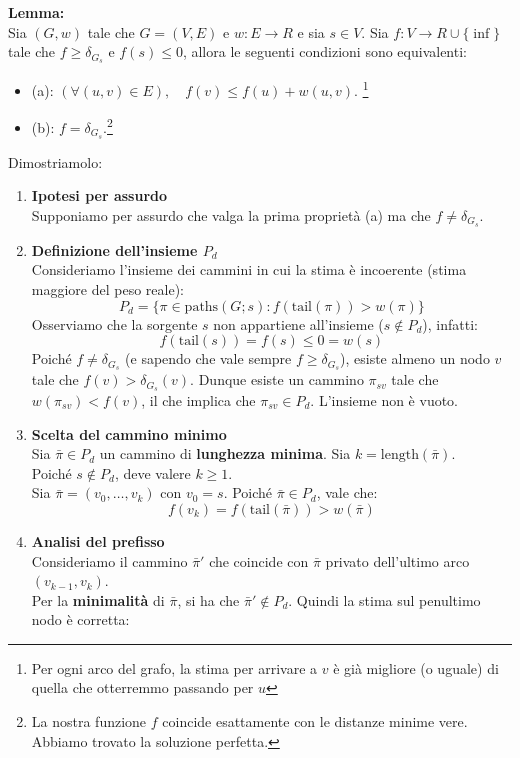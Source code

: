 \textbf{Lemma:}\\
Sia $(G,w)$ tale che $G=(V,E)$ e $w:E\rightarrow R$ e sia $s \in V$. Sia $f:V\rightarrow R \cup \{\inf\}$ tale che $f \geq \delta_{G_s}$ e $f(s)\leq 0$, allora le seguenti condizioni sono equivalenti:
\begin{itemize}
    \item (a): $(\forall(u,v) \in E), \quad f(v) \leq f(u)+ w(u,v)$. \footnote{Per ogni arco del grafo, la stima per arrivare a $v$ è già migliore (o uguale) di quella che otterremmo passando per $u$}
    \item (b): $f=\delta_{G_s}$.\footnote{La nostra funzione $f$ coincide esattamente con le distanze minime vere. Abbiamo trovato la soluzione perfetta.}
\end{itemize}
Dimostriamolo:\\
\begin{enumerate}
    \item \textbf{Ipotesi per assurdo} \\
    Supponiamo per assurdo che valga la prima proprietà (a) ma che $f \neq \delta_{G_s}$. 
    
    \item \textbf{Definizione dell'insieme $P_d$} \\
    Consideriamo l'insieme dei cammini in cui la stima è incoerente (stima maggiore del peso reale):
    \[P_d = \{ \pi \in \text{paths}(G;s) : f(\text{tail}(\pi)) > w(\pi) \}\]
    Osserviamo che la sorgente $s$ non appartiene all'insieme ($s \notin P_d$), infatti:
    \[f(\text{tail}(s)) = f(s) \leq 0 = w(s)\]
    Poiché $f \neq \delta_{G_s}$ (e sapendo che vale sempre $f \geq \delta_{G_s}$), esiste almeno un nodo $v$ tale che $f(v) > \delta_{G_s}(v)$. Dunque esiste un cammino $\pi_{sv}$ tale che $w(\pi_{sv}) < f(v)$, il che implica che $\pi_{sv} \in P_d$. L'insieme non è vuoto.

    \item \textbf{Scelta del cammino minimo} \\
    Sia $\bar{\pi} \in P_d$ un cammino di \textbf{lunghezza minima}. Sia $k = \text{length}(\bar{\pi})$. \\
    Poiché $s \notin P_d$, deve valere $k \geq 1$. \\
    Sia $\bar{\pi} = (v_0, \dots, v_k)$ con $v_0=s$. Poiché $\bar{\pi} \in P_d$, vale che:
    \[f(v_k) = f(\text{tail}(\bar{\pi})) > w(\bar{\pi})\]

    \item \textbf{Analisi del prefisso} \\
    Consideriamo il cammino $\bar{\pi}'$ che coincide con $\bar{\pi}$ privato dell'ultimo arco $(v_{k-1}, v_k)$. \\
    Per la \textbf{minimalità} di $\bar{\pi}$, si ha che $\bar{\pi}' \notin P_d$. Quindi la stima sul penultimo nodo è corretta:


\end{enumerate}
